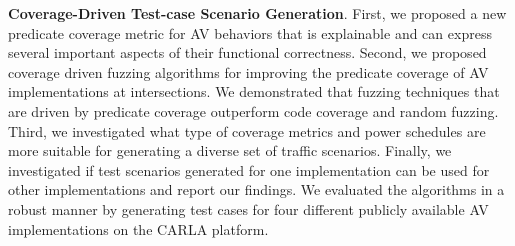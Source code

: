 \textbf{Coverage-Driven Test-case Scenario Generation}.
First, we proposed a new predicate coverage metric for AV behaviors that is explainable and can express several important aspects of their functional correctness.
% 
Second, we proposed coverage driven fuzzing algorithms for improving the predicate coverage of AV implementations at intersections.
% 
We demonstrated that fuzzing techniques that are driven by predicate coverage outperform code coverage and random fuzzing.
% 
Third, we investigated what type of coverage metrics and power schedules are more suitable for generating a diverse set of traffic scenarios.
% 
Finally, we investigated if test scenarios generated for one implementation can be used for other implementations and report our findings.
% 
We evaluated the algorithms in a robust manner by generating test cases for four different publicly available AV implementations on the CARLA platform.